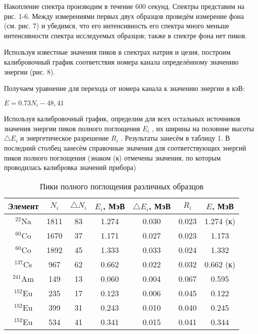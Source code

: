 Накопление спектра производим в течение 600 секунд. Спектры представим на рис.
1-6. Между измерениями первых двух образцов проведём измерение фона (см. рис. 7)
и убедимся, что его интенсивность его спектра много меньше интенсивности спектра
исследуемых образцов; также в спектре фона нет пиков.

Используя известные значения пиков в спектрах натрия и цезия, построим
калибровочный график соответствия номера канала определённому значению энергии
(рис. 8).

Получаем уравнение для перехода от номера канала к значению энергии в кэВ:
\begin{center}
    $E = 0.73N_i - 48,41$
\end{center}

Используя калибровочный график, определим для всех остальных источников значения
энергии пиков полного поглощения $E_i$ , их ширины на половине высоты $\triangle
E_i$ и энергетическое разрешение $R_i$ . Результаты занесём в таблицу 1. В
последний столбец занесём справочные значения для соответствующих энергий пиков
полного поглощения (знаком (к) отмечены значения, по которым проводилась
калибровка значений прибора)

\begin{table}[h]
  \centering
  \begin{center}
  \caption{Пики полного поглощения различных образцов}
  \end{center}
  \label{tab:my_label}
  \begin{tabular}{| c | c | c | c | c | c | c |}
    \hline
    Элемент & $N_i$ & $\triangle N_i$ & $E_i$, МэВ & $\triangle E_i$, МэВ &
    $R_i$ & $E$, МэВ \\
    \hline
    $^{22}$Na & 1811 & 83 & 1.274 & 0.030 & 0.023 & 1.274 (к) \\
    \hline
    $^{60}$Co & 1670 & 37 & 1.171 & 0.027 & 0.023  & 1.173 \\
    \hline
    $^{60}$Co & 1892 & 45 & 1.333 & 0.033 & 0.024 & 1.332 \\
    \hline
    $^{137}$Cs & 967 & 62 & 0.662 & 0.022 & 0.032 & 0.662 (к) \\
    \hline
    $^{241}$Am & 149 & 13 & 0.060 & 0.004 & 0.067 & 0.595 \\
    \hline
    $^{152}$Eu & 235 & 17 & 0.123 & 0.006 & 0.045 & 0.122 \\
    \hline
    $^{152}$Eu & 399 & 31 & 0.243 & 0.010 & 0.040 & 0.245 \\
    \hline
    $^{152}$Eu & 534 & 41 & 0.341 & 0.015 & 0.041 & 0.344 \\
    \hline
  \end{tabular}
\end{table}

